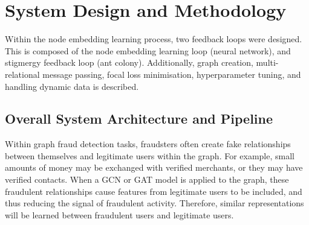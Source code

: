 \chapter{System Design and Methodology}
\label{ch:design}
\label{chap:methodology}

Within the node embedding learning process, two feedback loops were designed. This is composed of the node embedding learning loop (neural network), and stigmergy feedback loop (ant colony). Additionally, graph creation, multi-relational message passing, focal loss minimisation, hyperparameter tuning, and handling dynamic data is described.

\section[Overall System Architecture]{Overall System Architecture and Pipeline}
\label{sec:overall_arch}
\label{sec:arch_overview}

Within graph fraud detection tasks, fraudsters often create fake relationships between themselves and legitimate users within the graph. For example, small amounts of money may be exchanged with verified merchants, or they may have verified contacts. When a GCN or GAT model is applied to the graph, these fraudulent relationships cause features from legitimate users to be included, and thus reducing the signal of fraudulent activity. Therefore, similar representations will be learned between fraudulent users and legitimate users.

